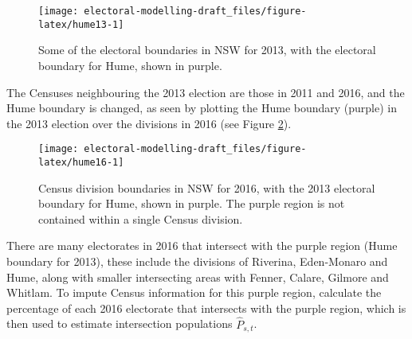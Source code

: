 \documentclass[openany]{book}
\begin{document}
\begin{figure}[h]

{\centering \texttt{[image: electoral-modelling-draft\_files/figure-latex/hume13-1]} 

}

\caption{Some of the electoral boundaries in NSW for 2013, with the electoral boundary for Hume, shown in purple.}\label{fig:hume13}
\end{figure}

The Censuses neighbouring the 2013 election are those in 2011 and 2016, and the Hume boundary is changed, as seen by plotting the Hume boundary (purple) in the 2013 election over the divisions in 2016 (see Figure \ref{fig:hume16}).

\begin{figure}[h]

{\centering \texttt{[image: electoral-modelling-draft\_files/figure-latex/hume16-1]} 

}

\caption{Census division boundaries in NSW for 2016, with the 2013 electoral boundary for Hume, shown in purple. The purple region is not contained within a single Census division.}\label{fig:hume16}
\end{figure}

There are many electorates in 2016 that intersect with the purple region (Hume boundary for 2013), these include the divisions of Riverina, Eden-Monaro and Hume, along with smaller intersecting areas with Fenner, Calare, Gilmore and Whitlam. To impute Census information for this purple region, calculate the percentage of each 2016 electorate that intersects with the purple region, which is then used to estimate intersection populations \(\hat{P}_{s,t}\).
\end{document}
